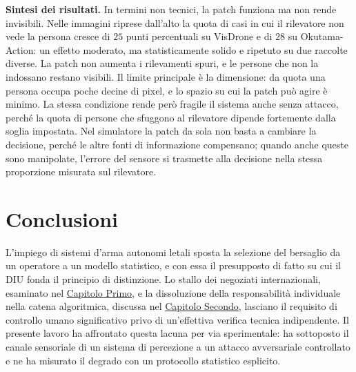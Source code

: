 \ifstampa\documentclass[a4paper,12pt,twoside,openright]{report}\else\documentclass[a4paper,12pt]{report}\fi
\newif\ifrevisione \revisionefalse
\DeclareRobustCommand{\rev}[1]{\ifrevisione{\color{blue!65!black}#1}\else#1\fi}
\newcommand{\notarev}[1]{\ifrevisione\par\medskip\noindent\fcolorbox{blue!65!black}{blue!4}{\parbox{\dimexpr\linewidth-2\fboxsep-2\fboxrule\relax}{\small\setstretch{1}\textbf{Nota per la revisione.} #1}}\par\medskip\fi}
\begin{document}
\notarev{Nella versione precedente questo paragrafo dichiarava quattro difetti
di implementazione del simulatore. Sono stati corretti nel codice (estrazione
di Bernoulli su $R_1$ e $1 - R_2$, riferimento ancorato alle misure del primo
livello, distanza esclusa anche dalla confidenza), le simulazioni sono state
rieseguite e i valori del primo esperimento ne verificano la coerenza.}

\rev{\textbf{Sintesi dei risultati.}
In termini non tecnici, la patch funziona ma non rende invisibili. Nelle
immagini riprese dall'alto la quota di casi in cui il rilevatore non vede la
persona cresce di $25$ punti percentuali su VisDrone e di $28$ su
Okutama-Action: un effetto moderato, ma statisticamente solido e ripetuto su due
raccolte diverse. La patch non aumenta i rilevamenti spuri, e le persone che
non la indossano restano visibili. Il limite principale è la dimensione: da
quota una persona occupa poche decine di pixel, e lo spazio su cui la patch può
agire è minimo. La stessa condizione rende però fragile il sistema anche senza
attacco, perché la quota di persone che sfuggono al rilevatore dipende
fortemente dalla soglia impostata. Nel simulatore la patch da sola non basta a
cambiare la decisione, perché le altre fonti di informazione compensano; quando
anche queste sono manipolate, l'errore del sensore si trasmette alla decisione
nella stessa proporzione misurata sul rilevatore.}

\notarev{Paragrafo divulgativo richiesto dal Prof. Buffa.}


\chapter{Conclusioni}
\label{cap6}

L'impiego di sistemi d'arma autonomi letali sposta la selezione del bersaglio da un operatore a un modello statistico, e con essa il presupposto di fatto su cui il \rev{DIU} fonda il principio di distinzione. Lo stallo dei negoziati internazionali, esaminato nel \hyperref[cap1]{Capitolo Primo}, e la dissoluzione della responsabilità individuale nella catena algoritmica, discussa nel \hyperref[cap2]{Capitolo Secondo}, lasciano il requisito di controllo umano significativo privo di \rev{un'effettiva} verifica tecnica indipendente. Il presente lavoro ha affrontato questa lacuna per via sperimentale: ha sottoposto il canale sensoriale di un sistema di percezione a un attacco avversariale controllato e ne ha misurato il degrado con un protocollo statistico esplicito.
\end{document}

